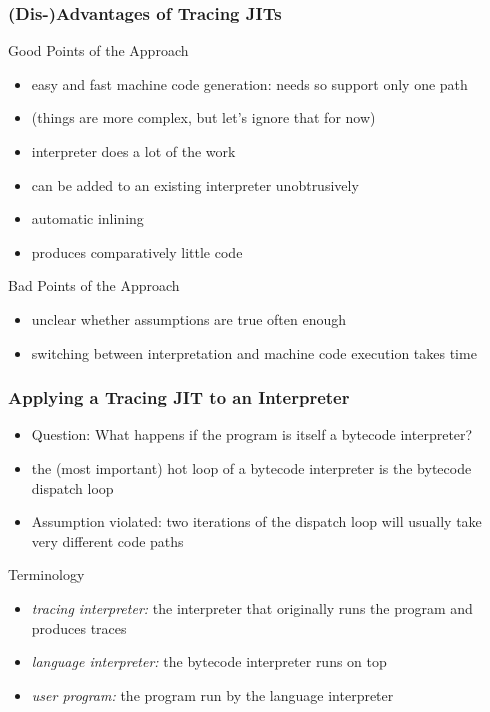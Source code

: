 \documentclass[utf8x]{beamer}
\begin{document}
\begin{frame}
    \frametitle{(Dis-)Advantages of Tracing JITs}
    \begin{block}{Good Points of the Approach}
        \begin{itemize}
        \item easy and fast machine code generation: needs so support only one path
        \item (things are more complex, but let's ignore that for now)
        \item interpreter does a lot of the work
        \item can be added to an existing interpreter unobtrusively
        \item automatic inlining
        \item produces comparatively little code
        \end{itemize}
    \end{block}
    \pause
    \begin{block}{Bad Points of the Approach}
        \begin{itemize}
        \item unclear whether assumptions are true often enough
        \item switching between interpretation and machine code execution takes time
        \end{itemize}
    \end{block}
\end{frame}

\begin{frame}
    \frametitle{Applying a Tracing JIT to an Interpreter}
    \begin{itemize}
    \item Question: What happens if the program is itself a bytecode interpreter?
    \item the (most important) hot loop of a bytecode interpreter is the bytecode dispatch loop
    \item Assumption violated: two iterations of the dispatch loop will usually take very different code paths
    \end{itemize}
    \pause
    \begin{block}{Terminology}
        \begin{itemize}
        \item \emph{tracing interpreter:} the interpreter that originally runs the program and produces traces
        \item \emph{language interpreter:} the bytecode interpreter runs on top
        \item \emph{user program:} the program run by the language interpreter
        \end{itemize}
    \end{block}
\end{frame}
\end{document}
